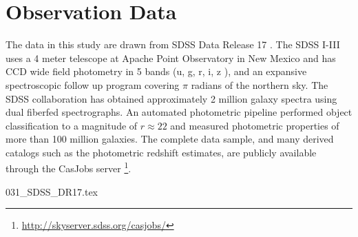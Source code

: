 \section{Observation Data}
The data in this study are drawn from SDSS Data Release
17 \cite{accetta2022seventeenth}. The SDSS I-III uses a 4 meter telescope at Apache Point Observatory in New Mexico and has CCD wide field photometry in 5 bands (u, g, r, i, z \cite{gunn20062} \cite{smith2002ugriz}), and an expansive spectroscopic follow up program \cite{eisenstein2011sdss} covering $\pi$ radians of the northern sky. The SDSS collaboration has obtained approximately 2 million galaxy spectra using dual fiberfed spectrographs. An automated photometric pipeline performed object classification to a magnitude of $r \approx 22$ and measured photometric properties of more than 100 million galaxies. The complete data sample, and many derived catalogs such as the photometric redshift estimates, are publicly available through the CasJobs server\cite{li2008casjobs} \footnote{\url{http://skyserver.sdss.org/casjobs/}}.

{031_SDSS_DR17.tex}